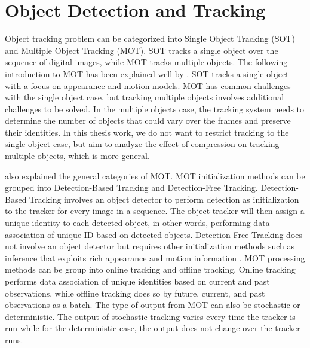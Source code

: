 \section{Object Detection and Tracking}
\label{sec:introduction/section_a}

Object tracking problem can be categorized into Single Object Tracking (SOT) and Multiple Object Tracking (MOT). SOT tracks a single object over the sequence of digital images, while MOT tracks multiple objects. The following introduction to MOT has been explained well by \citeauthor{luo_multiple_2021} \cite{luo_multiple_2021}. SOT tracks a single object with a focus on appearance and motion models. MOT has common challenges with the single object case, but tracking multiple objects involves additional challenges to be solved. In the multiple objects case, the tracking system needs to determine the number of objects that could vary over the frames and preserve their identities. In this thesis work, we do not want to restrict tracking to the single object case, but aim to analyze the effect of compression on tracking multiple objects, which is more general.

\citeauthor{luo_multiple_2021} \cite{luo_multiple_2021} also explained the general categories of MOT. MOT initialization methods can be grouped into Detection-Based Tracking and Detection-Free Tracking. Detection-Based Tracking involves an object detector to perform detection as initialization to the tracker for every image in a sequence. The object tracker will then assign a unique identity to each detected object, in other words, performing data association of unique ID based on detected objects. Detection-Free Tracking does not involve an object detector but requires other initialization methods such as inference that exploits rich appearance and motion information \cite{lin_detection-free_2016}. MOT processing methods can be group into online tracking and offline tracking. Online tracking performs data association of unique identities based on current and past observations, while offline tracking does so by future, current, and past observations as a batch. The type of output from MOT can also be stochastic or deterministic. The output of stochastic tracking varies every time the tracker is run while for the deterministic case, the output does not change over the tracker runs.

